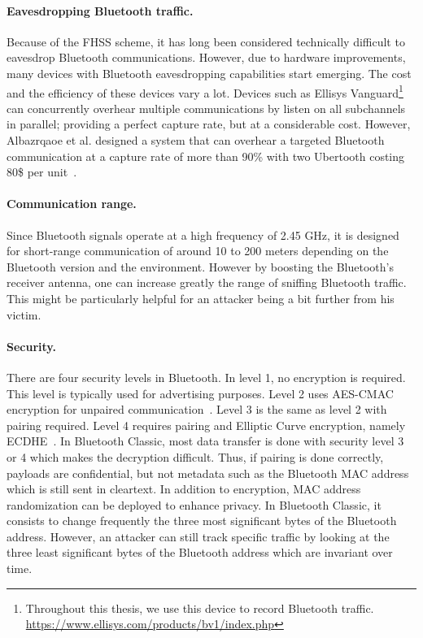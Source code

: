 \paragraph{Eavesdropping Bluetooth traffic.} Because of the FHSS scheme, it has long been considered technically difficult to eavesdrop Bluetooth communications. However, due to hardware improvements, many devices with Bluetooth eavesdropping capabilities start emerging. The cost and the efficiency of these devices vary a lot. Devices such as Ellisys Vanguard\footnote{Throughout this thesis, we use this device to record Bluetooth traffic. \url{https://www.ellisys.com/products/bv1/index.php}} can concurrently overhear multiple communications by listen on all subchannels in parallel; providing a perfect capture rate, but at a considerable cost. However, Albazrqaoe et al. designed a system that can overhear a targeted Bluetooth communication at a capture rate of more than 90\% with two Ubertooth costing 80\$ per unit~\cite{blueEar}. 

\paragraph{Communication range.} Since Bluetooth signals operate at a high frequency of 2.45 GHz, it is designed for short-range communication of around 10 to 200 meters depending on the Bluetooth version and the environment. However by boosting the Bluetooth's receiver antenna, one can increase greatly the range of sniffing Bluetooth traffic. This might be particularly helpful for an attacker being a bit further from his victim.

\newpage

\paragraph{Security.} There are four security levels in Bluetooth. In level 1, no encryption is required. This level is typically used for advertising purposes. Level 2 uses AES-CMAC encryption for unpaired communication~\cite{rfc4493}. Level 3 is the same as level 2 with pairing required. Level 4 requires pairing and Elliptic Curve encryption, namely ECDHE~\cite{hankerson2006guide}. In Bluetooth Classic,  most data transfer is done with security level 3 or 4 which makes the decryption difficult. Thus, if pairing is done correctly, payloads are confidential, but not metadata such as the Bluetooth MAC address which is still sent in cleartext. In addition to encryption, MAC address randomization can be deployed to enhance privacy. In Bluetooth Classic, it consists to change frequently the three most significant bytes of the Bluetooth address. However, an attacker can still track specific traffic by looking at the three least significant bytes of the Bluetooth address which are invariant over time.



